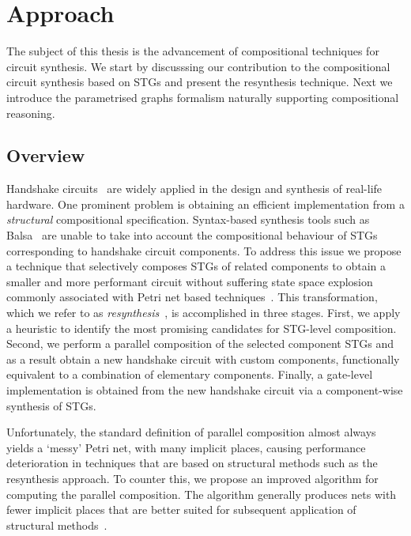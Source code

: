\chapter{Approach\label{chap:Approach}}

The subject of this thesis is the advancement of compositional techniques for circuit synthesis. We start by discusssing our contribution to the compositional circuit synthesis based on STGs and present the resynthesis technique. Next we introduce the parametrised graphs formalism naturally supporting compositional reasoning. 


\section{Overview}
Handshake circuits~\cite{van2004handshake} are widely applied in the design and synthesis of real-life hardware.
One prominent problem is obtaining an efficient implementation from a \emph{structural} compositional specification.
Syntax-based synthesis tools such as Balsa~\cite{balsa} are unable to take into account the compositional
behaviour of STGs corresponding to handshake circuit components. To address this issue we propose 
a technique that selectively composes STGs of related components to obtain a smaller and more performant
circuit without suffering state space explosion commonly associated with Petri net based techniques~\cite{Valmari}.
This transformation, which we refer to as \emph{resynthesis}~\cite{ukaf_balsa_resynthesis,CN-02,KVL-96,PC-96}, is accomplished in three stages. First, we apply a heuristic to identify the most promising candidates for STG-level composition. Second, we perform a parallel composition of the selected component STGs and as a result obtain a new handshake circuit with custom components, functionally equivalent to a combination of elementary components. Finally, a gate-level implementation is obtained from the new handshake circuit via a component-wise synthesis of STGs.

Unfortunately, the standard definition of parallel composition almost always yields a `messy' Petri net, with many implicit places, causing performance deterioration in techniques that are based on structural methods such as the resynthesis approach. To counter this, we propose an improved algorithm for computing the parallel composition. The algorithm generally produces nets with fewer implicit places that are better suited for subsequent application of structural methods~\cite{improved_par_comp}.

